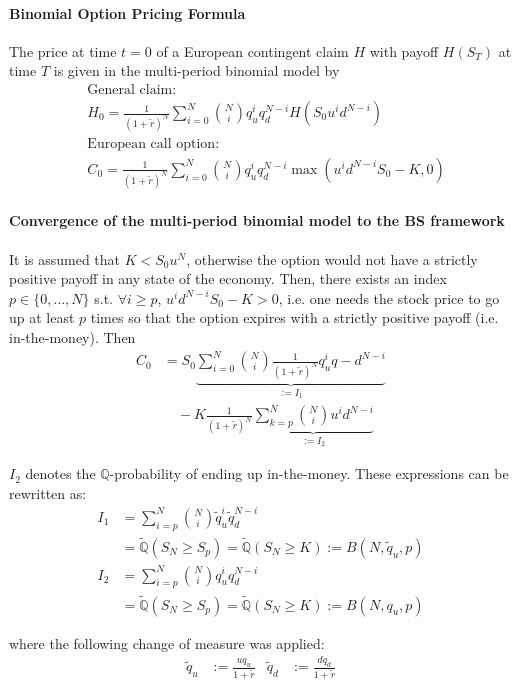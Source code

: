 \documentclass[a4paper,landscape,7pt,fleqn]{scrartcl}
\begin{document}
\begin{multicols*}{3}
\paragraph{Binomial Option Pricing Formula}
The price at time $t=0$ of a European contingent claim $H$ with payoff $H(S_T)$ at time $T$ is given in the multi-period binomial model by
\begin{align*}
& \text{General claim:} \\
& H_0 = \frac{1}{(1 + \tilde r)^N} \sum_{i=0}^N \binom{N}{i} q_u^i q_d^{N-i} H(S_0 u^i d^{N-i}) \\
& \text{European call option:} \\
& C_0 = \frac{1}{(1 + \tilde r)^N} \sum_{i=0}^N \binom{N}{i} q_u^i q_d^{N-i} \max(u^i d^{N-i} S_0 - K, 0)
\end{align*}

\paragraph{Convergence of the multi-period binomial model to the BS framework}
It is assumed that $K < S_0 u^N$, otherwise the option would not have a strictly positive payoff in any state of the economy. Then, there exists an index $p \in \{ 0, \ldots, N \}$ s.t. $\forall i \geq p$, $u^i d^{N-i} S_0 - K > 0$, i.e. one needs the stock price to go up at least $p$ times so that the option expires with a strictly positive payoff (i.e. in-the-money). Then
\begin{align*}
C_0 &= S_0 \underbrace{\sum_{i=0}^N \binom{N}{i} \frac{1}{(1 + \tilde r)^N} q_u^i q-d^{N-i}}_{:= I_1} \\
& \quad - K \frac{1}{(1 + \tilde r)^N} \underbrace{\sum_{k=p}^N \binom{N}{i} u^i d^{N-i}}_{:= I_2}
\end{align*}

$I_2$ denotes the $\mathbb{Q}$-probability of ending up in-the-money. These expressions can be rewritten as:
\begin{align*}
I_1 &= \sum_{i=p}^N \binom{N}{i} \tilde q_u^i \tilde q_d^{N-i} \\
& = \tilde{\mathbb{Q}}(S_N \geq S_p) = \tilde{\mathbb{Q}}(S_N \geq K) := B(N,\tilde q_u, p) \\
I_2 &= \sum_{i=p}^N \binom{N}{i} q_u^i q_d^{N-i} \\
&= \tilde{\mathbb{Q}}(S_N \geq S_p) = \tilde{\mathbb{Q}}(S_N \geq K) := B(N, q_u, p)
\end{align*}

where the following change of measure was applied:
\begin{align*}
\tilde q_u &:= \frac{u q_u}{1 + \tilde r} & \tilde q_d &:= \frac{d q_d}{1 + \tilde r}
\end{align*}


\end{multicols*}
\end{document}
